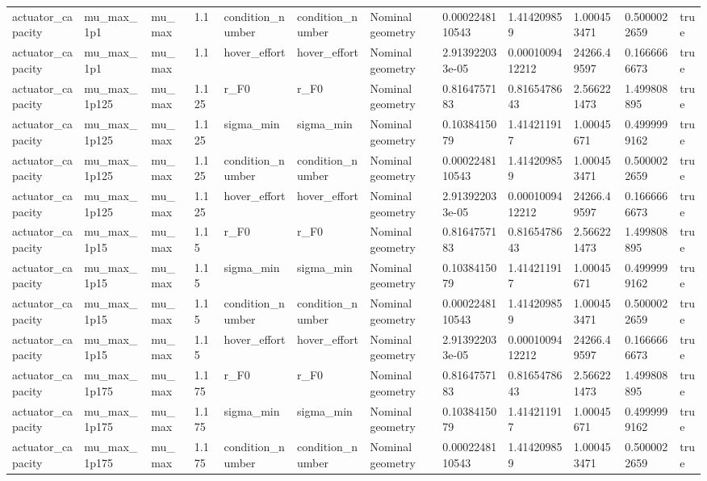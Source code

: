\begin{tabular}{@{}llllllllllll@{}}
actuator\_capacity & mu\_max\_1p1 & mu\_max & 1.1 & condition\_number & condition\_number & Nominal geometry & 0.0002248110543 & 1.414209859 & 1.000453471 & 0.5000022659 & true \\
actuator\_capacity & mu\_max\_1p1 & mu\_max & 1.1 & hover\_effort & hover\_effort & Nominal geometry & 2.913922033e-05 & 0.0001009412212 & 24266.49597 & 0.1666666673 & true \\
actuator\_capacity & mu\_max\_1p125 & mu\_max & 1.125 & r\_F0 & r\_F0 & Nominal geometry & 0.8164757183 & 0.8165478643 & 2.566221473 & 1.499808895 & true \\
actuator\_capacity & mu\_max\_1p125 & mu\_max & 1.125 & sigma\_min & sigma\_min & Nominal geometry & 0.1038415079 & 1.414211917 & 1.00045671 & 0.4999999162 & true \\
actuator\_capacity & mu\_max\_1p125 & mu\_max & 1.125 & condition\_number & condition\_number & Nominal geometry & 0.0002248110543 & 1.414209859 & 1.000453471 & 0.5000022659 & true \\
actuator\_capacity & mu\_max\_1p125 & mu\_max & 1.125 & hover\_effort & hover\_effort & Nominal geometry & 2.913922033e-05 & 0.0001009412212 & 24266.49597 & 0.1666666673 & true \\
actuator\_capacity & mu\_max\_1p15 & mu\_max & 1.15 & r\_F0 & r\_F0 & Nominal geometry & 0.8164757183 & 0.8165478643 & 2.566221473 & 1.499808895 & true \\
actuator\_capacity & mu\_max\_1p15 & mu\_max & 1.15 & sigma\_min & sigma\_min & Nominal geometry & 0.1038415079 & 1.414211917 & 1.00045671 & 0.4999999162 & true \\
actuator\_capacity & mu\_max\_1p15 & mu\_max & 1.15 & condition\_number & condition\_number & Nominal geometry & 0.0002248110543 & 1.414209859 & 1.000453471 & 0.5000022659 & true \\
actuator\_capacity & mu\_max\_1p15 & mu\_max & 1.15 & hover\_effort & hover\_effort & Nominal geometry & 2.913922033e-05 & 0.0001009412212 & 24266.49597 & 0.1666666673 & true \\
actuator\_capacity & mu\_max\_1p175 & mu\_max & 1.175 & r\_F0 & r\_F0 & Nominal geometry & 0.8164757183 & 0.8165478643 & 2.566221473 & 1.499808895 & true \\
actuator\_capacity & mu\_max\_1p175 & mu\_max & 1.175 & sigma\_min & sigma\_min & Nominal geometry & 0.1038415079 & 1.414211917 & 1.00045671 & 0.4999999162 & true \\
actuator\_capacity & mu\_max\_1p175 & mu\_max & 1.175 & condition\_number & condition\_number & Nominal geometry & 0.0002248110543 & 1.414209859 & 1.000453471 & 0.5000022659 & true \\

\end{tabular}
